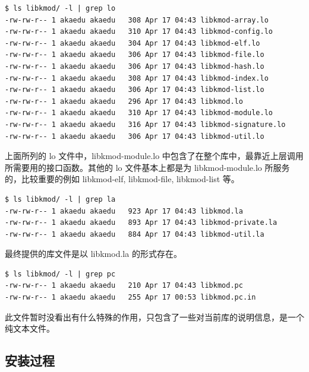{\begin{shaded}\begin{verbatim}
$ ls libkmod/ -l | grep lo 
-rw-rw-r-- 1 akaedu akaedu   308 Apr 17 04:43 libkmod-array.lo
-rw-rw-r-- 1 akaedu akaedu   310 Apr 17 04:43 libkmod-config.lo
-rw-rw-r-- 1 akaedu akaedu   304 Apr 17 04:43 libkmod-elf.lo
-rw-rw-r-- 1 akaedu akaedu   306 Apr 17 04:43 libkmod-file.lo
-rw-rw-r-- 1 akaedu akaedu   306 Apr 17 04:43 libkmod-hash.lo
-rw-rw-r-- 1 akaedu akaedu   308 Apr 17 04:43 libkmod-index.lo
-rw-rw-r-- 1 akaedu akaedu   306 Apr 17 04:43 libkmod-list.lo
-rw-rw-r-- 1 akaedu akaedu   296 Apr 17 04:43 libkmod.lo
-rw-rw-r-- 1 akaedu akaedu   310 Apr 17 04:43 libkmod-module.lo
-rw-rw-r-- 1 akaedu akaedu   316 Apr 17 04:43 libkmod-signature.lo
-rw-rw-r-- 1 akaedu akaedu   306 Apr 17 04:43 libkmod-util.lo
\end{verbatim}\end{shaded}}
上面所列的 lo 文件中，libkmod-module.lo
中包含了在整个库中，最靠近上层调用所需要用的接口函数。其他的 lo
文件基本上都是为 libkmod-module.lo 所服务的，比较重要的例如 libkmod-elf,
libkmod-file, libkmod-list 等。

{\begin{shaded}\begin{verbatim}
$ ls libkmod/ -l | grep la
-rw-rw-r-- 1 akaedu akaedu   923 Apr 17 04:43 libkmod.la
-rw-rw-r-- 1 akaedu akaedu   893 Apr 17 04:43 libkmod-private.la
-rw-rw-r-- 1 akaedu akaedu   884 Apr 17 04:43 libkmod-util.la
\end{verbatim}\end{shaded}}
最终提供的库文件是以 libkmod.la 的形式存在。

{\begin{shaded}\begin{verbatim}
$ ls libkmod/ -l | grep pc
-rw-rw-r-- 1 akaedu akaedu   210 Apr 17 04:43 libkmod.pc
-rw-rw-r-- 1 akaedu akaedu   255 Apr 17 00:53 libkmod.pc.in
\end{verbatim}\end{shaded}}
此文件暂时没看出有什么特殊的作用，只包含了一些对当前库的说明信息，是一个纯文本文件。

\subsection{安装过程}

